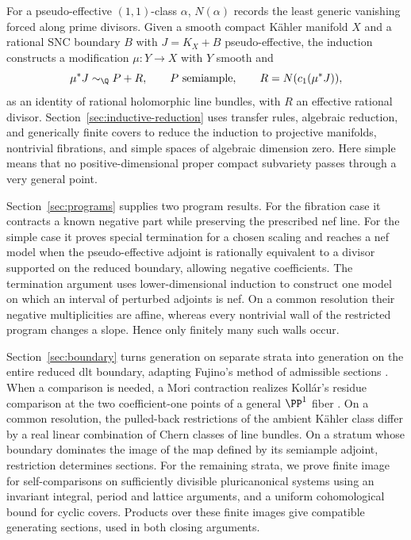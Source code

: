 For a pseudo-effective \((1,1)\)-class \(\alpha\), \(N(\alpha)\) records
the least generic vanishing forced along prime divisors. Given a smooth
compact Kähler manifold \(X\) and a rational SNC boundary \(B\) with
\(J=K_X+B\) pseudo-effective, the induction constructs a modification
\(\mu:Y\to X\) with \(Y\) smooth and
\[
 \mu^*J\sim_{\Q}P+R,\qquad P\text{ semiample},\qquad
 R=N(c_1(\mu^*J)),
\]
as an identity of rational holomorphic line bundles, with \(R\) an effective
rational divisor. Section~\ref{sec:inductive-reduction} uses transfer rules,
algebraic reduction, and generically finite covers to reduce the induction
to projective manifolds, nontrivial fibrations, and simple spaces of
algebraic dimension zero. Here simple means that no positive-dimensional
proper compact subvariety passes through a very general point.

Section~\ref{sec:programs} supplies two program results. For the fibration
case it contracts a known negative part while preserving the prescribed nef
line. For the simple case it proves special termination for a chosen scaling
and reaches a nef model when the pseudo-effective adjoint is rationally
equivalent to a divisor supported on the reduced boundary, allowing negative
coefficients. The termination argument uses lower-dimensional induction to
construct one model on which an interval of perturbed adjoints is nef. On a
common resolution their negative multiplicities are affine, whereas every
nontrivial wall of the restricted program changes a slope. Hence only
finitely many such walls occur.

Section~\ref{sec:boundary} turns generation on separate strata into generation
on the entire reduced dlt boundary, adapting Fujino's method of admissible
sections \cite[Section~4]{Fujino2000}. When a comparison is needed, a Mori
contraction realizes Kollár's residue comparison at the two coefficient-one
points of a general \(\PP^1\) fiber
\cite[Definition~13 and Proposition~14]{Kollar2013Sources}. On a common
resolution, the pulled-back restrictions of the ambient Kähler class differ
by a real linear combination of Chern classes of line bundles. On a stratum
whose boundary dominates the image of the map
defined by its semiample adjoint, restriction determines sections. For the
remaining strata, we prove finite image for self-comparisons on sufficiently
divisible pluricanonical systems using an invariant integral, period and
lattice arguments, and a uniform cohomological bound for cyclic covers.
Products over these finite images give compatible generating sections, used
in both closing arguments.

